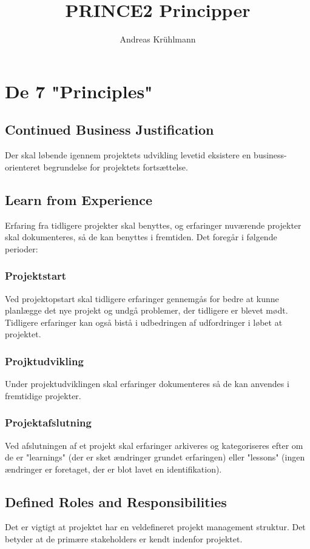 \documentclass[12pt,twoside]{article}
\title{PRINCE2 Principper}
\author{Andreas Krühlmann}
\begin{document}
    \maketitle
    \newpage
    \tableofcontents
    \newpage
    \section{De 7 "Principles"}

    \subsection{Continued Business Justification}
    Der skal løbende igennem projektets udvikling levetid eksistere en business-orienteret begrundelse for projektets fortsættelse.

    \subsection{Learn from Experience}
    Erfaring fra tidligere projekter skal benyttes, og erfaringer nuværende projekter skal dokumenteres, så de kan benyttes i fremtiden. Det foregår i følgende perioder:

    \subsubsection*{Projektstart}
    Ved projektopstart skal tidligere erfaringer gennemgås for bedre at kunne planlægge det nye projekt og undgå problemer, der tidligere er blevet mødt. Tidligere erfaringer kan også bistå i udbedringen af udfordringer i løbet at projektet.
    \subsubsection*{Projktudvikling}
    Under projektudviklingen skal erfaringer dokumenteres så de kan anvendes i fremtidige projekter.
    \subsubsection*{Projektafslutning}
    Ved afslutningen af et projekt skal erfaringer arkiveres og kategoriseres efter om de er "learnings" (der er sket ændringer grundet erfaringen) eller "lessons" (ingen ændringer er foretaget, der er blot lavet en identifikation).

    \subsection{Defined Roles and Responsibilities}
    \label{sec:defined_roles_and_responsibilities}
    Det er vigtigt at projektet har en veldefineret projekt management struktur. Det betyder at de primære stakeholders er kendt indenfor projektet.
\end{document}
